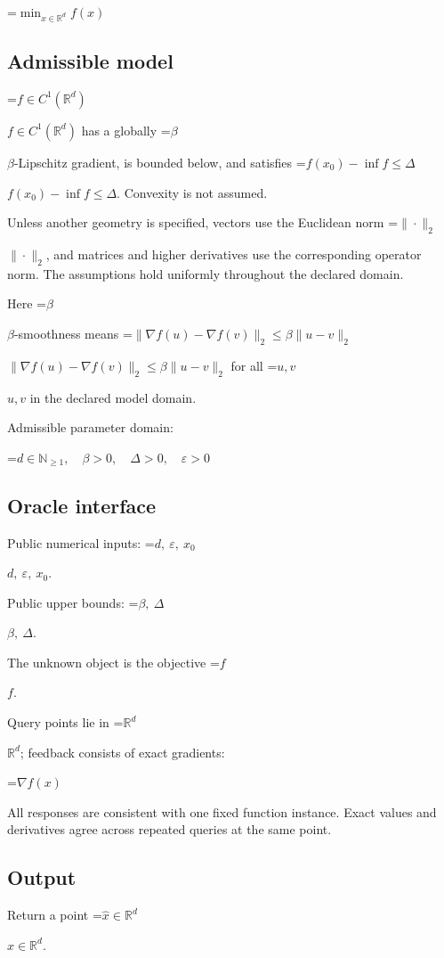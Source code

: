 \documentclass[10pt,a4paper]{article}
\newcommand{\AtlasMath}[1]{\par\begingroup\centering\setbox0=\hbox{$\displaystyle #1$}\ifdim\wd0>1.4\linewidth\typeout{ATLAS WIDE FORMULA: \the\wd0}\fi\ifdim\wd0>\linewidth\resizebox{\linewidth}{!}{\box0}\else\box0\fi\par\endgroup}
\newcommand{\AtlasInlineMath}[1]{\begingroup\setbox0=\hbox{$#1$}\ifdim\wd0>.4\linewidth\endgroup\AtlasMath{#1}\else\endgroup$#1$\fi}
\begin{document}
\AtlasMath{\min_{x\in \mathbb{R}^d}f(x)}




\subsection{Admissible model}
\AtlasInlineMath{f\in C^1(\mathbb R^d)} has a globally \AtlasInlineMath{\beta}-Lipschitz gradient, is bounded below, and satisfies \AtlasInlineMath{f(x_0)-\inf f\le\Delta}. Convexity is not assumed.

Unless another geometry is specified, vectors use the Euclidean norm \AtlasInlineMath{\|\cdot\|_2}, and matrices and higher derivatives use the corresponding operator norm. The assumptions hold uniformly throughout the declared domain.

Here \AtlasInlineMath{\beta}-smoothness means \AtlasInlineMath{\|\nabla f(u)-\nabla f(v)\|_2\le\beta\|u-v\|_2} for all \AtlasInlineMath{u,v} in the declared model domain.

Admissible parameter domain:




\AtlasMath{d\in\mathbb{N}_{\ge1},\quad \beta>0,\quad \Delta>0,\quad \varepsilon>0}




\subsection{Oracle interface}
Public numerical inputs: \AtlasInlineMath{d,\ \varepsilon,\ x_0}.

Public upper bounds: \AtlasInlineMath{\beta,\ \Delta}.

The unknown object is the objective \AtlasInlineMath{f}.

Query points lie in \AtlasInlineMath{\mathbb{R}^d}; feedback consists of exact gradients:




\AtlasMath{\nabla f(x)}




All responses are consistent with one fixed function instance. Exact values and derivatives agree across repeated queries at the same point.

\subsection{Output}
Return a point \AtlasInlineMath{\widehat x\in\mathbb R^d}.
\end{document}
